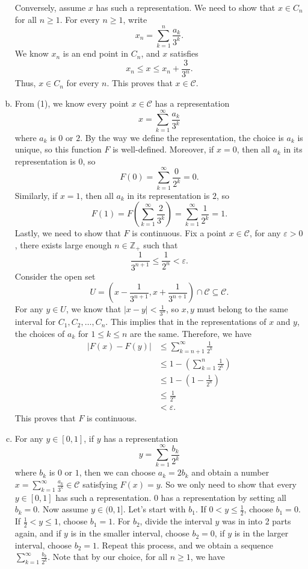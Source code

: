 \documentclass[letterpaper, 12pt]{article}
\begin{document}
\begin{solution}
\begin{enumerate}[(a)]
  Conversely, assume \(x\) has such a representation. We need to show that \(x\in C_n\) for all \(n\geq 1\). For every \(n\geq 1\), write 
  \[x_n=\sum_{k=1}^{n}\frac{a_k}{3^k}.\]
  We know \(x_n\) is an end point in \(C_n\), and \(x\) satisfies
  \[x_n\leq x\leq x_n+\frac{3}{3^n}.\]
  Thus, \(x\in C_n\) for every \(n\). This proves that \(x\in \mathcal{C}\).
  \item From (1), we know every point \(x\in \mathcal{C}\) has a representation
  \[x=\sum_{k=1}^{\infty}\frac{a_k}{3^k}\]
  where \(a_k\) is \(0\) or \(2\). By the way we define the representation, the choice is \(a_k\) is unique, so this function \(F\) is well-defined. Moreover, if \(x=0\), then all \(a_k\) in its representation is \(0\), so 
  \[F(0)=\sum_{k=1}^{\infty}\frac{0}{2^k}=0.\]
  Similarly, if \(x=1\), then all \(a_k\) in its representation is \(2\), so 
  \[F(1)=F(\sum_{k=1}^{\infty}\frac{2}{3^k})=\sum_{k=1}^{\infty}\frac{1}{2^k}=1.\]
  Lastly, we need to show that \(F\) is continuous. Fix a point \(x\in \mathcal{C}\), for any \(\varepsilon>0\), there exists large enough \(n\in \mathbb{Z}_+\) such that 
  \[\frac{1}{3^{n+1}}\leq \frac{1}{2^n}< \varepsilon.\]
  Consider the open set 
  \[U=(x-\frac{1}{3^{n+1}},x+\frac{1}{3^{n+1}})\cap \mathcal{C}\subseteq \mathcal{C}.\]
  For any \(y\in U\), we know that \(|x-y|<\frac{1}{3^n}\), so \(x,y\) must belong to the same interval for \(C_1,C_2,\ldots, C_n\). This implies that in the representations of \(x\) and \(y\), the choices of \(a_k\) for \(1\leq k\leq n\) are the same. Therefore, we have 
  \begin{align*}
       |F(x)-F(y)|&\leq \sum_{k=n+1}^{\infty}\frac{1}{2^k}\\ 
                  &\leq 1-(\sum_{k=1}^{n}\frac{1}{2^k})\\ 
                  &\leq 1-(1-\frac{1}{2^n})\\
                  &\leq \frac{1}{2^n}\\
                  &<\varepsilon.
  \end{align*} 
  This proves that \(F\) is continuous.
  \item For any \(y\in [0,1]\), if \(y\) has a representation 
  \[y=\sum_{k=1}^{\infty}\frac{b_k}{2^k}\]
  where \(b_k\) is \(0\) or \(1\), then we can choose \(a_k=2b_k\) and obtain a number \(x=\sum_{k=1}^{\infty}\frac{a_k}{3^k}\in \mathcal{C}\) satisfying \(F(x)=y\). So we only need to show that every \(y\in [0,1]\) has such a representation. \(0\) has a representation by setting all \(b_k=0\). Now assume \(y\in (0,1]\). Let's start with \(b_1\). If \(0< y\leq \frac{1}{2}\), choose \(b_1=0\). If \(\frac{1}{2}< y\leq 1\), choose \(b_1=1\). For \(b_2\), divide the interval \(y\) was in into 2 parts again, and if \(y\) is in the smaller interval, choose \(b_2=0\), if \(y\) is in the larger interval, choose \(b_2=1\). Repeat this process, and we obtain a sequence \(\sum_{k=1}^{\infty}\frac{b_k}{2^k}\). Note that by our choice, for all \(n\geq 1\), we have

\end{enumerate}
\end{solution}
\end{document}
